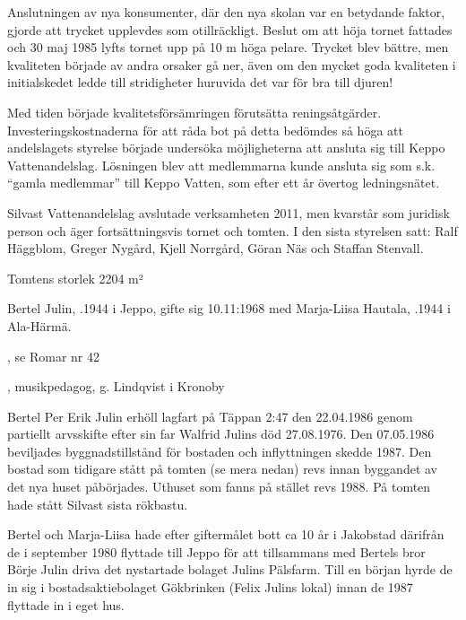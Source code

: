 Anslutningen av nya konsumenter, där den nya  skolan var en betydande faktor, gjorde att trycket upplevdes som otillräckligt. Beslut om att höja tornet fattades och 30 maj 1985 lyfts tornet upp på 10 m höga pelare. Trycket blev bättre, men kvaliteten började av andra orsaker gå ner, även om den mycket goda kvaliteten i initialskedet ledde till stridigheter huruvida det var för bra till djuren!

Med tiden började kvalitetsförsämringen förutsätta reningsåtgärder. Investeringskostnaderna för att råda bot på detta bedömdes så höga att andelslagets styrelse började undersöka möjligheterna att ansluta sig till Keppo Vattenandelslag. Lösningen blev att medlemmarna kunde ansluta sig som s.k. ``gamla medlemmar'' till Keppo Vatten, som efter ett år övertog ledningsnätet.

Silvast Vattenandelslag avslutade verksamheten 2011, men kvarstår som juridisk person och äger fortsättningsvis tornet och tomten. I den sista styrelsen satt: Ralf Häggblom, Greger Nygård, Kjell Norrgård, Göran Näs och Staffan Stenvall.



 Tomtens storlek 2204 m²



Bertel Julin, .1944 i Jeppo, gifte sig 10.11:1968 med Marja-Liisa Hautala, .1944 i Ala-Härmä.
\begin{jhchildren}
  \item {}, se Romar nr 42
  \item {}, musikpedagog, g. Lindqvist i Kronoby
\end{jhchildren}
Bertel Per Erik Julin erhöll lagfart på Täppan 2:47 den 22.04.1986 genom partiellt arvsskifte efter sin far Walfrid Julins död 27.08.1976. Den 07.05.1986 beviljades byggnadstillstånd för bostaden och inflyttningen skedde 1987. Den bostad som tidigare stått på tomten (se mera nedan) revs innan byggandet av det nya huset påbörjades. Uthuset som fanns på stället revs 1988. På tomten hade stått Silvast sista rökbastu.

Bertel och Marja-Liisa hade efter giftermålet bott ca 10 år i Jakobstad därifrån de i september 1980 flyttade till Jeppo för att tillsammans med Bertels bror Börje Julin driva det nystartade bolaget Julins Pälsfarm. Till en början hyrde de in sig i bostadsaktiebolaget Gökbrinken (Felix Julins lokal) innan de 1987 flyttade in i eget hus.

